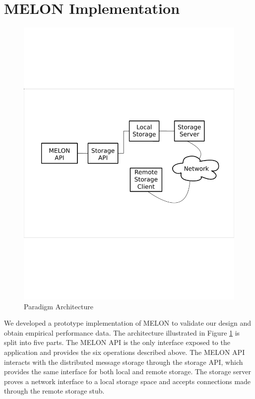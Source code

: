 \documentclass[lnicst]{svmultln}
\begin{document}
\section{MELON Implementation}\label{sec:implementation}

\begin{figure}
\centering
\includegraphics[scale = .30, clip, trim = 10px 280px 10px 250px]{figures/paradigm_arch.pdf}
\caption{Paradigm Architecture}
\label{fig:architecture}
\end{figure}

We developed a prototype implementation of MELON to validate our design and obtain empirical performance data. The architecture illustrated in Figure \ref{fig:architecture} is split into five parts. The MELON API is the only interface exposed to the application and provides the six operations described above. The MELON API interacts with the distributed message storage through the storage API, which provides the same interface for both local and remote storage. The storage server proves a network interface to a local storage space and accepts connections made through the remote storage stub.
\end{document}
